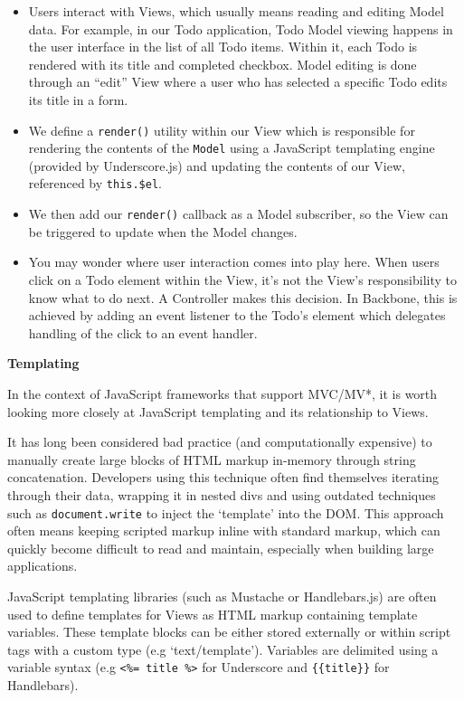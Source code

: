 \documentclass[9pt]{book}
\begin{document}
\begin{itemize}
\item
  Users interact with Views, which usually means reading and editing
  Model data. For example, in our Todo application, Todo Model viewing
  happens in the user interface in the list of all Todo items. Within
  it, each Todo is rendered with its title and completed checkbox. Model
  editing is done through an ``edit'' View where a user who has selected
  a specific Todo edits its title in a form.
\item
  We define a \texttt{render()} utility within our View which is
  responsible for rendering the contents of the \texttt{Model} using a
  JavaScript templating engine (provided by Underscore.js) and updating
  the contents of our View, referenced by \texttt{this.\$el}.
\item
  We then add our \texttt{render()} callback as a Model subscriber, so
  the View can be triggered to update when the Model changes.
\item
  You may wonder where user interaction comes into play here. When users
  click on a Todo element within the View, it's not the View's
  responsibility to know what to do next. A Controller makes this
  decision. In Backbone, this is achieved by adding an event listener to
  the Todo's element which delegates handling of the click to an event
  handler.
\end{itemize}

\textbf{Templating}

In the context of JavaScript frameworks that support MVC/MV*, it is
worth looking more closely at JavaScript templating and its relationship
to Views.

It has long been considered bad practice (and computationally expensive)
to manually create large blocks of HTML markup in-memory through string
concatenation. Developers using this technique often find themselves
iterating through their data, wrapping it in nested divs and using
outdated techniques such as \texttt{document.write} to inject the
`template' into the DOM. This approach often means keeping scripted
markup inline with standard markup, which can quickly become difficult
to read and maintain, especially when building large applications.

JavaScript templating libraries (such as Mustache or Handlebars.js) are
often used to define templates for Views as HTML markup containing
template variables. These template blocks can be either stored
externally or within script tags with a custom type (e.g
`text/template'). Variables are delimited using a variable syntax (e.g
\texttt{\textless{}\%= title \%\textgreater{}} for Underscore and
\texttt{\{\{title\}\}} for Handlebars).
\end{document}
